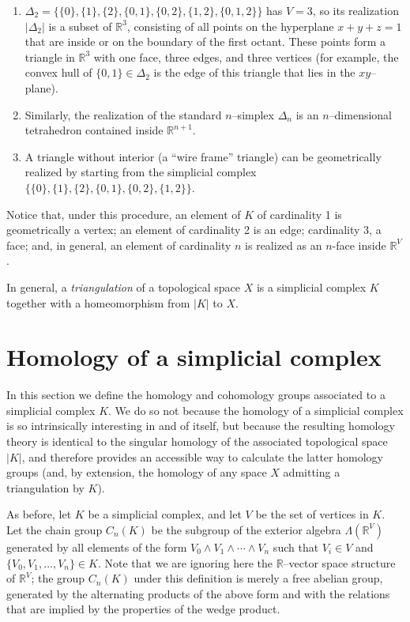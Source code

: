 \documentclass[12pt]{article}
\newcommand{\R}{\mathbb{R}}
\begin{document}
\begin{enumerate}
\item $\Delta_2 = \{\{0\}, \{1\}, \{2\}, \{0,1\}, \{0,2\}, \{1,2\},
\{0,1,2\}\}$ has $V = 3$, so its realization $|\Delta_2|$ is a subset
of $\mathbb{R}^3$, consisting of all points on the hyperplane $x+y+z =
1$ that are inside or on the boundary of the first octant. These
points form a triangle in $\mathbb{R}^3$ with one face, three edges,
and three vertices (for example, the convex hull of $\{0,1\} \in
\Delta_2$ is the edge of this triangle that lies in the $xy$--plane).
\item Similarly, the realization of the standard $n$--simplex
$\Delta_n$ is an $n$--dimensional tetrahedron contained inside
$\mathbb{R}^{n+1}$.
\item A triangle without interior (a ``wire frame'' triangle) can be
geometrically realized by starting from the simplicial complex
$\{\{0\}, \{1\}, \{2\}, \{0,1\}, \{0,2\}, \{1,2\}\}$.
\end{enumerate}

Notice that, under this procedure, an element of $K$ of cardinality 1
is geometrically a vertex; an element of cardinality 2 is an edge;
cardinality 3, a face; and, in general, an element of cardinality $n$
is realized as an $n$-face inside $\R^V$.

In general, a \emph{triangulation} of a topological space $X$ is a
simplicial complex $K$ together with a homeomorphism from $|K|$ to
$X$.

\section{Homology of a simplicial complex}

In this section we define the homology and cohomology groups
associated to a simplicial complex $K$. We do so not because the
homology of a simplicial complex is so intrinsically interesting in
and of itself, but because the resulting homology theory is identical
to the singular homology of the associated topological space $|K|$,
and therefore provides an accessible way to calculate the latter
homology groups (and, by extension, the homology of any space $X$
admitting a triangulation by $K$).

As before, let $K$ be a simplicial complex, and let $V$ be the set of
vertices in $K$. Let the chain group $C_n(K)$ be the subgroup of the
exterior algebra $\Lambda(\R^V)$ generated by all elements of the form
$V_0 \wedge V_1 \wedge \cdots \wedge V_n$ such that $V_i \in V$ and
$\{V_0, V_1, \ldots, V_n\} \in K$. Note that we are ignoring here the
$\R$--vector space structure of $\R^V$; the group $C_n(K)$ under this
definition is merely a free abelian group, generated by the
alternating products of the above form and with the relations that are
implied by the properties of the wedge product.
\end{document}
